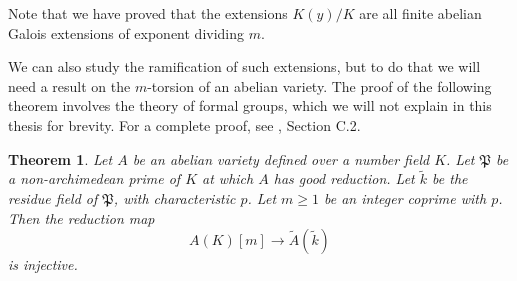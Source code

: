 \documentclass[a4paper, 12pt]{amsart}
\theoremstyle{definition}
\theoremstyle{plain}
\theoremstyle{plain}
\newtheorem{thm0}[defn0]{Theorem}
\theoremstyle{plain}
\theoremstyle{plain}
\theoremstyle{remark}
\theoremstyle{remark}
\theoremstyle{plain}
\newenvironment{theorem}{ \begin{thm0}}{\end{thm0}}
\renewcommand{\P}{\mathfrak{P}}
\begin{document}
	Note that we have proved that the extensions $K(y)/K$ are all finite abelian Galois extensions of exponent dividing $m$.
	
	We can also study the ramification of such extensions, but to do that we will need a result on the $m$-torsion of an abelian variety. The proof of the following theorem involves the theory of formal groups, which we will not explain in this thesis for brevity. For a complete proof, see \cite{Hindry_Silverman_2000}, Section C.2.
	
	\begin{theorem}\label{torsioninjects}
		Let $A$ be an abelian variety defined over a number field $K$. Let $\P$ be a non-archimedean prime of $K$ at which $A$ has good reduction. Let $\tilde{k}$ be the residue field of $\P$, with characteristic $p$. Let $m\ge 1$ be an integer coprime with $p$. Then the reduction map
		\begin{equation*}
			A(K)[m]\rightarrow \tilde{A}(\tilde{k})
		\end{equation*}
		is injective.
	\end{theorem}
	
\end{document}
